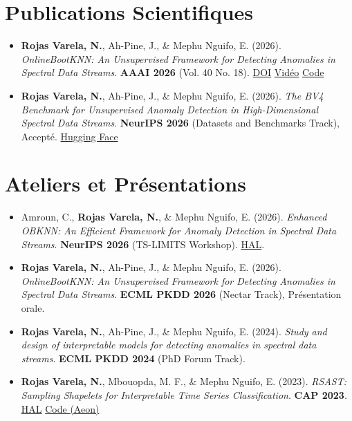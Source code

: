 \documentclass[12pt,a4paper]{article}
\begin{document}
\section*{Publications Scientifiques}
\begin{itemize}
\item \textbf{Rojas Varela, N.}, Ah-Pine, J., \& Mephu Nguifo, E. (2026). \textit{OnlineBootKNN: An Unsupervised Framework for Detecting Anomalies in Spectral Data Streams}. \textbf{AAAI 2026} (Vol. 40 No. 18). \href{https://doi.org/10.1609/aaai.v40i18.38611}{DOI} \textbar{} \href{https://underline.io/lecture/141774-onlinebootknn-an-unsupervised-framework-for-detecting-anomalies-in-spectral-data-streams}{Vidéo} \textbar{} \href{https://github.com/nirojasva/spectral-benchmark}{Code}
\item \textbf{Rojas Varela, N.}, Ah-Pine, J., \& Mephu Nguifo, E. (2026). \textit{The BV4 Benchmark for Unsupervised Anomaly Detection in High-Dimensional Spectral Data Streams}. \textbf{NeurIPS 2026} (Datasets and Benchmarks Track), Accepté. \href{https://huggingface.co/datasets/nirojasva/spectral-benchmark-bv4}{Hugging Face}
\end{itemize}

\section*{Ateliers et Présentations}
\begin{itemize}
\item Amroun, C., \textbf{Rojas Varela, N.}, \& Mephu Nguifo, E. (2026). \textit{Enhanced OBKNN: An Efficient Framework for Anomaly Detection in Spectral Data Streams}. \textbf{NeurIPS 2026} (TS-LIMITS Workshop). \href{https://hal.science/hal-05803665/}{HAL}.
\item \textbf{Rojas Varela, N.}, Ah-Pine, J., \& Mephu Nguifo, E. (2026). \textit{OnlineBootKNN: An Unsupervised Framework for Detecting Anomalies in Spectral Data Streams}. \textbf{ECML PKDD 2026} (Nectar Track), Présentation orale.
\item \textbf{Rojas Varela, N.}, Ah-Pine, J., \& Mephu Nguifo, E. (2024). \textit{Study and design of interpretable models for detecting anomalies in spectral data streams}. \textbf{ECML PKDD 2024} (PhD Forum Track).
\item \textbf{Rojas Varela, N.}, Mbouopda, M. F., \& Mephu Nguifo, E. (2023). \textit{RSAST: Sampling Shapelets for Interpretable Time Series Classification}. \textbf{CAP 2023}. \href{https://hal.science/hal-04311309/}{HAL} \textbar{} \href{https://www.aeon-toolkit.org/en/v1.1.0/api_reference/auto_generated/aeon.transformations.collection.shapelet_based.RSAST.html}{Code (Aeon)}
\end{itemize}
\end{document}
